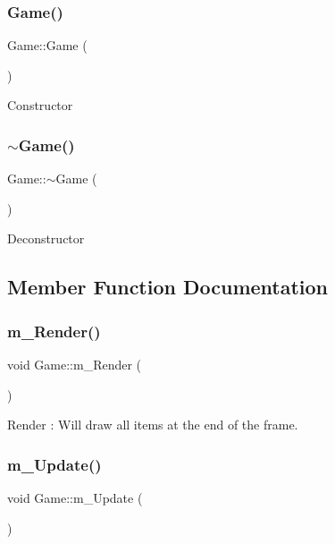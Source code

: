 \subsubsection{\texorpdfstring{Game()}{Game()}}
{\footnotesize\ttfamily Game\+::\+Game (\begin{DoxyParamCaption}{ }\end{DoxyParamCaption})}

Constructor \mbox{\label{class_game_ae3d112ca6e0e55150d2fdbc704474530}} 
\subsubsection{\texorpdfstring{$\sim$\+Game()}{~Game()}}
{\footnotesize\ttfamily Game\+::$\sim$\+Game (\begin{DoxyParamCaption}{ }\end{DoxyParamCaption})}

Deconstructor 

\subsection{Member Function Documentation}
\mbox{\label{class_game_a7150c86176921b18dd884498085ea699}} 
\subsubsection{\texorpdfstring{m\+\_\+\+Render()}{m\_Render()}}
{\footnotesize\ttfamily void Game\+::m\+\_\+\+Render (\begin{DoxyParamCaption}{ }\end{DoxyParamCaption})}

Render \+: Will draw all items at the end of the frame. \mbox{\label{class_game_af7a9000e9370aa423ee3b5dda9620d54}} 
\subsubsection{\texorpdfstring{m\+\_\+\+Update()}{m\_Update()}}
{\footnotesize\ttfamily void Game\+::m\+\_\+\+Update (\begin{DoxyParamCaption}{ }\end{DoxyParamCaption})}

